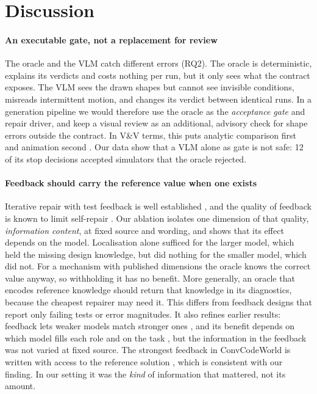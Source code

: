 \section{Discussion}\label{sec:discussion}

\paragraph{An executable gate, not a replacement for review} The oracle and the VLM catch different errors (RQ2). The oracle is deterministic, explains its verdicts and costs nothing per run, but it only sees what the contract exposes. The VLM sees the drawn shapes but cannot see invisible conditions, misreads intermittent motion, and changes its verdict between identical runs. In a generation pipeline we would therefore use the oracle as the \emph{acceptance gate} and repair driver, and keep a visual review as an additional, advisory check for shape errors outside the contract. In V\&V terms, this puts analytic comparison first and animation second \citep{sargent2013vv}. Our data show that a VLM alone as gate is not safe: 12 of its stop decisions accepted simulators that the oracle rejected.

\paragraph{Feedback should carry the reference value when one exists} Iterative repair with test feedback is well established \citep{chen2023selfdebug,xia2024chatrepair,olausson2024selfrepair}, and the quality of feedback is known to limit self-repair \citep{olausson2024selfrepair}. Our ablation isolates one dimension of that quality, \emph{information content}, at fixed source and wording, and shows that its effect depends on the model. Localisation alone sufficed for the larger model, which held the missing design knowledge, but did nothing for the smaller model, which did not. For a mechanism with published dimensions the oracle knows the correct value anyway, so withholding it has no benefit. More generally, an oracle that encodes reference knowledge should return that knowledge in its diagnostics, because the cheapest repairer may need it. This differs from feedback designs that report only failing tests or error magnitudes. It also refines earlier results: feedback lets weaker models match stronger ones \citep{han2025convcodeworld}, and its benefit depends on which model fills each role and on the task \citep{pan2025gfr}, but the information in the feedback was not varied at fixed source. The strongest feedback in ConvCodeWorld is written with access to the reference solution \citep{han2025convcodeworld}, which is consistent with our finding. In our setting it was the \emph{kind} of information that mattered, not its amount.

